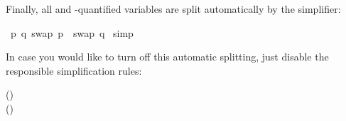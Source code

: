 \begin{isabellebody}
\begin{isamarkuptext}
Finally, all \isa{{\isasymforall}} and \isa{{\isasymexists}}-quantified variables are split
automatically by the simplifier:%
\end{isamarkuptext}%
\ {\isachardoublequote}{\isasymforall}p{\isachardot}\ {\isasymexists}q{\isachardot}\ swap\ p\ {\isacharequal}\ swap\ q{\isachardoublequote}\isanewline
{}\ simp\isanewline
{}%
\begin{isamarkuptext}%
\noindent
In case you would like to turn off this automatic splitting, just disable the
responsible simplification rules:
\begin{center}
\hfill
()\\
\hfill
()
\end{center}%
\end{isamarkuptext}%
\end{isabellebody}%
